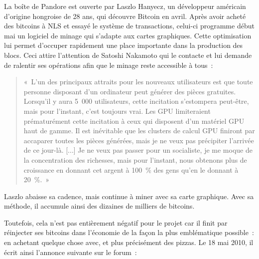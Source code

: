 La boîte de Pandore est ouverte par Laszlo Hanyecz, un développeur américain d'origine hongroise de 28 ans, qui découvre Bitcoin en avril. Après avoir acheté des bitcoins à NLS et essayé le système de transactions, celui-ci programme début mai un logiciel de minage qui s'adapte aux cartes graphiques. Cette optimisation lui permet d'occuper rapidement une place importante dans la production des blocs. Ceci attire l'attention de Satoshi Nakamoto qui le contacte et lui demande de ralentir ses opérations afin que le minage reste accessible à tous~:

\begin{quote}
«~L'un des principaux attraits pour les nouveaux utilisateurs est que toute personne disposant d'un ordinateur peut générer des pièces gratuites. Lorsqu'il y aura 5~000 utilisateurs, cette incitation s'estompera peut-être, mais pour l'instant, c'est toujours vrai. Les GPU limiteraient prématurément cette incitation à ceux qui disposent d'un matériel GPU haut de gamme. Il est inévitable que les clusters de calcul GPU finiront par accaparer toutes les pièces générées, mais je ne veux pas précipiter l'arrivée de ce jour-là. [...] Je ne veux pas passer pour un socialiste, je me moque de la concentration des richesses, mais pour l'instant, nous obtenons plus de croissance en donnant cet argent à 100~\% des gens qu'en le donnant à 20~\%.~»
\end{quote}

Laszlo abaisse sa cadence, mais continue à miner avec sa carte graphique. Avec sa méthode, il accumule ainsi des dizaines de milliers de bitcoins.

Toutefois, cela n'est pas entièrement négatif pour le projet car il finit par réinjecter ses bitcoins dans l'économie de la façon la plus emblématique possible~: en achetant quelque chose avec, et plus précisément des pizzas. Le 18 mai 2010, il écrit ainsi l'annonce suivante sur le forum~:


